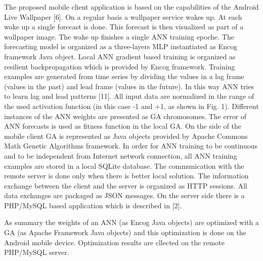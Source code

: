 \documentclass{llncs}
\begin{document}
The proposed mobile client application is based on the capabilities of the Android Live Wallpaper [6]. On a regular basis a wallpaper service wakes up. At each wake up a single forecast is done. This forecast is then visualized as part of a wallpaper image. The wake up finishes a single ANN training epoche. The forecasting model is organized as a three-layers MLP instantiated as Encog framework Java object. Local ANN gradient based training is organized as resilient backpropagation which is provided by Encog framework. Training examples are generated from time series by dividing the values in a lag frame (values in the past) and lead frame (values in the future). In this way ANN tries to learn lag and lead patterns [11]. All input data are normalized in the range of the used activation function (in this case -1 and +1, as shown in Fig. 1). Different instances of the ANN weights are presented as GA chromosomes. The error of ANN forecasts is used as fitness function in the local GA. On the side of the mobile client GA is represented as Java objects provided by Apache Commons Math Genetic Algorithms framework. In order for ANN training to be continuous and to be independent from Internet network connection, all ANN training examples are stored in a local SQLite database. The communication with the remote server is done only when there is better local solution. The information exchange between the client and the server is organized as HTTP sessions. All data exchanges are packaged as JSON messages. On the server side there is a PHP/MySQL based application which is described in [2]. 

As summary the weights of an ANN (as Encog Java objects) are optimized with a GA (as Apache Framework Java objects) and this optimization is done on the Android mobile device. Optimization results are cllected on the remote PHP/MySQL server.
%
\end{document}
